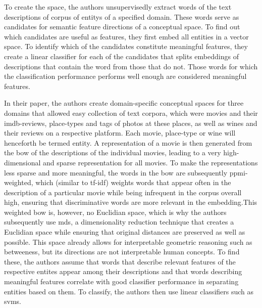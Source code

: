 To create the space, the authors unsupervisedly extract words of the text descriptions of corpus of \glspl{entity} of a specified domain. These words serve as candidates for semantic feature directions of a conceptual space. To find out which candidates are useful as features, they first embed all entities in a vector space. To identify which of the candidates constitute meaningful features, they create a linear classifier for each of the candidates that splits embeddings of descriptions that contain the word from those that do not. Those words for which the classification performance performs well enough are considered meaningful features.  

In their paper, the authors create domain-specific conceptual spaces for three domains that allowed easy collection of text corpora, which were movies and their \gls{imdb}-reviews, place-types and tags of photos at these places, as well as wines and their reviews on a respective platform. Each movie, place-type or wine will henceforth be termed \gls{entity}. A representation of a movie is then generated from the \gls{bow} of the descriptions of the individual movies, leading to a very high-dimensional and sparse representation for all movies. To make the representations less sparse and more meaningful, the words in the \gls{bow} are subsequently \gls{ppmi}-weighted, which (similar to \gls{tf-idf}) weights words that appear often in the description of a particular movie while being infrequent in the corpus overall high, ensuring that discriminative words are more relevant in the embedding.This weighted \gls{bow} is, however, no Euclidian space, which is why the authors subsequently use \gls{mds}, a dimensionality reduction technique that creates a Euclidian space while ensuring that original distances are preserved as well as possible. This space already allows for interpretable geometric reasoning such as betweeness, but its directions are not interpretable human concepts. To find these, the authors assume that words that describe relevant features of the respective entites appear among their descriptions and that words describing meaningful features correlate with good classifier performance in separating entities based on them. To classify, the authors then use linear classifiers such as \glspl{svm}. 

